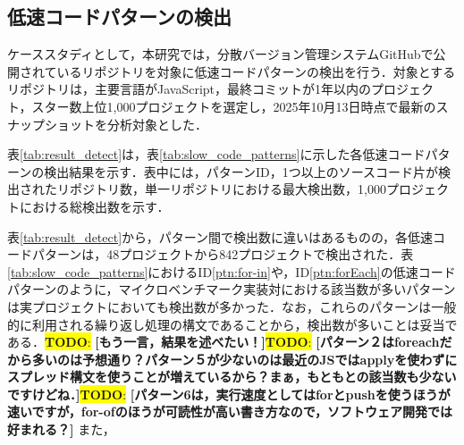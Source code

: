 \documentclass[submit,techrep,noauthor]{ipsj}
\newcommand{\todo}[1]{\colorbox{yellow}{{\bf TODO}:}{\color{red} {\textbf{[#1]}}}}
\begin{document}
\subsection{低速コードパターンの検出}

ケーススタディとして，本研究では，分散バージョン管理システムGitHubで公開されているリポジトリを対象に低速コードパターンの検出を行う．対象とするリポジトリは，主要言語がJavaScript，最終コミットが1年以内のプロジェクト，スター数上位1,000プロジェクトを選定し，2025年10月13日時点で最新のスナップショットを分析対象とした．

表\ref{tab:result_detect}は，表\ref{tab:slow_code_patterns}に示した各低速コードパターンの検出結果を示す．表中には，パターンID，1つ以上のソースコード片が検出されたリポジトリ数，単一リポジトリにおける最大検出数，1,000プロジェクトにおける総検出数を示す．

表\ref{tab:result_detect}から，パターン間で検出数に違いはあるものの，各低速コードパターンは，48プロジェクトから842プロジェクトで検出された．表\ref{tab:slow_code_patterns}におけるID\ref{ptn:for-in}や，ID\ref{ptn:forEach}の低速コードパターンのように，マイクロベンチマーク実装対における該当数が多いパターンは実プロジェクトにおいても検出数が多かった．なお，これらのパターンは一般的に利用される繰り返し処理の構文であることから，検出数が多いことは妥当である．\todo{もう一言，結果を述べたい！}\todo{パターン２はforeachだから多いのは予想通り？パターン５が少ないのは最近のJSではapplyを使わずにスプレッド構文を使うことが増えているから？まぁ，もともとの該当数も少ないですけどね．}\todo{パターン6は，実行速度としてはforとpushを使うほうが速いですが，for-ofのほうが可読性が高い書き方なので，ソフトウェア開発では好まれる？}
また，

\begin{table}[t]
    \centering
    \caption{低速コードパターンに基づく検出結果}
    \label{tab:result_detect}
\end{table}
\end{document}
